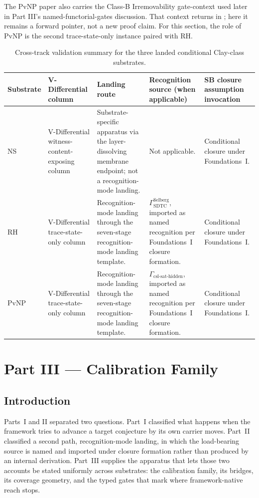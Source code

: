 \documentclass[11pt]{article}
\newcommand{\VDTSO}{V-Differential trace-state-only column}
\newcommand{\VDWCE}{V-Differential witness-content-exposing column}
\newcommand{\SevenStage}{seven-stage recognition-mode landing template}
\theoremstyle{definition}
\begin{document}
The PvNP paper also carries the Class-B Irremovability gate-context used
later in Part III's named-functorial-gates discussion. That context
returns in ; here it remains a forward pointer, not
a new proof claim. For this section, the role of PvNP is the
second trace-state-only instance paired with RH.

\begin{table}[H]
  \centering
  \caption{Cross-track validation summary for the three landed conditional Clay-class substrates.}
  \label{tab:cross-track-validation}
  \scriptsize
  \renewcommand{\arraystretch}{1.08}
  \begin{tabularx}{\textwidth}{@{}>{\raggedright\arraybackslash}p{}>{\raggedright\arraybackslash}p{}>{\raggedright\arraybackslash}X>{\raggedright\arraybackslash}p{}>{\raggedright\arraybackslash}p{}@{}}
    \toprule
    Substrate & V-Differential column & Landing route & Recognition source (when applicable) & SB closure assumption invocation \\
    \midrule
    NS & \VDWCE & Substrate-specific apparatus via the layer-dissolving membrane endpoint; not a recognition-mode landing. & Not applicable. & Conditional closure under Foundations~I. \\
    RH & \VDTSO & Recognition-mode landing through the \SevenStage. & \(\Gamma_{\text{SDTC}}^{\text{Selberg}}\), imported as named recognition per Foundations~I closure formation. & Conditional closure under Foundations~I. \\
    PvNP & \VDTSO & Recognition-mode landing through the \SevenStage. & \(\Gamma_{\text{csl-sat-hidden}}\), imported as named recognition per Foundations~I closure formation. & Conditional closure under Foundations~I. \\
    \bottomrule
  \end{tabularx}
\end{table}
  \section{Part III --- Calibration Family}\label{sec:calibration}

\subsection{Introduction}\label{sec:calibration:intro}

Parts~I and II separated two questions.  Part~I classified what happens
when the framework tries to advance a target conjecture by its own
carrier moves.  Part~II classified a second path, recognition-mode
landing, in which the load-bearing source is named and imported under
closure formation rather than produced by an internal derivation.  Part~III
supplies the apparatus that lets those two accounts be stated uniformly
across substrates: the calibration family, its bridges, its coverage
geometry, and the typed gates that mark where framework-native reach stops.
\end{document}
